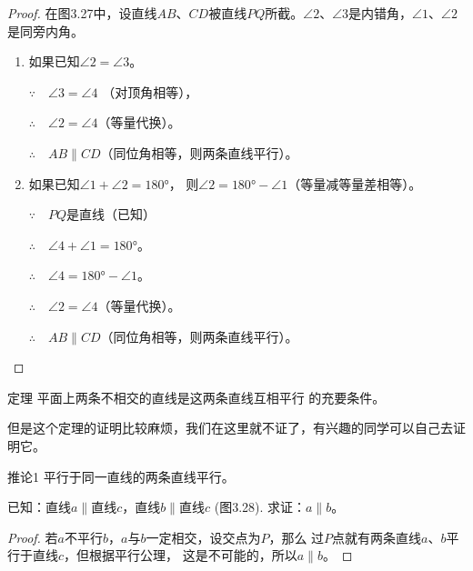 \begin{proof}
   在图3.27中，设直线$AB$、$CD$被直线$PQ$所截。$\angle 2$、$\angle 3$是内错角，$\angle 1$、$\angle 2$是同旁内角。
\begin{enumerate}
    \item 如果已知$\angle 2=\angle 3$。

$\because\quad \angle 3=\angle 4$    （对顶角相等），

$\therefore\quad \angle 2=\angle 4$（等量代换）。

$\therefore\quad AB\parallel CD$（同位角相等，则两条直线平行）。

\item 如果已知$\angle 1+\angle 2=\ang{180}$，
则$\angle 2=\ang{180}-\angle 1$（等量减等量差相等）。

$\because\quad PQ$是直线（已知）

$\therefore\quad \angle 4+\angle 1=\ang{180}$。

$\therefore\quad \angle 4=\ang{180}-\angle 1$。

$\therefore\quad \angle 2=\angle 4$（等量代换）。

$\therefore\quad AB\parallel CD$（同位角相等，则两条直线平行）。  
\end{enumerate}
\end{proof}

\begin{Theorem}{定理} 
    平面上两条不相交的直线是这两条直线互相平行
的充要条件。
\end{Theorem}

但是这个定理的证明比较麻烦，我们在这里就不证了，有兴趣的同学可以自己去证明它。

\begin{Deduction}{推论1} 
平行于同一直线的两条直线平行。 
\end{Deduction}

已知：直线$a\parallel$直线$c$，直线$b\parallel$直线$c$ (图3.28). 求证：$a\parallel b$。

\begin{proof}
    若$a$不平行$b$，$a$与$b$一定相交，设交点为$P$，那么
过$P$点就有两条直线$a$、$b$平行于直线$c$，但根据平行公理，
这是不可能的，所以$a\parallel b$。
\end{proof}

\begin{figure}
    \caption{}
\end{figure}


